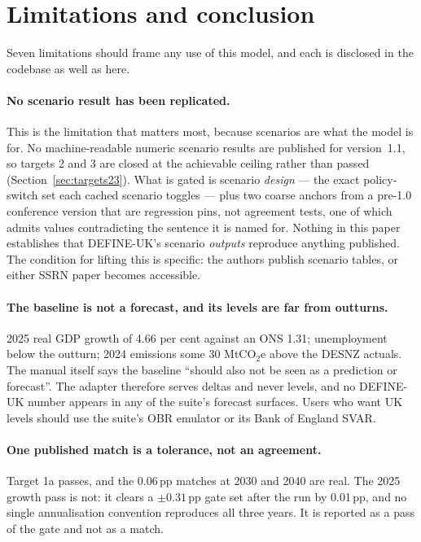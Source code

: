 \section{Limitations and conclusion}
\label{sec:limitations}

Seven limitations should frame any use of this model, and each is disclosed in the codebase as well as here.

\paragraph{No scenario result has been replicated.} This is the limitation that matters most, because scenarios are what the model is for. No machine-readable numeric scenario results are published for version~1.1, so targets 2 and 3 are closed at the achievable ceiling rather than passed (Section~\ref{sec:targets23}). What is gated is scenario \emph{design} --- the exact policy-switch set each cached scenario toggles --- plus two coarse anchors from a pre-1.0 conference version that are regression pins, not agreement tests, one of which admits values contradicting the sentence it is named for. Nothing in this paper establishes that DEFINE-UK's scenario \emph{outputs} reproduce anything published. The condition for lifting this is specific: the authors publish scenario tables, or either SSRN paper becomes accessible.

\paragraph{The baseline is not a forecast, and its levels are far from outturns.} 2025 real GDP growth of 4.66 per cent against an ONS 1.31; unemployment below the outturn; 2024 emissions some 30 MtCO$_2$e above the DESNZ actuals. The manual itself says the baseline ``should also not be seen as a prediction or forecast''. The adapter therefore serves deltas and never levels, and no DEFINE-UK number appears in any of the suite's forecast surfaces. Users who want UK levels should use the suite's OBR emulator or its Bank of England SVAR.

\paragraph{One published match is a tolerance, not an agreement.} Target 1a passes, and the 0.06\,pp matches at 2030 and 2040 are real. The 2025 growth pass is not: it clears a $\pm0.31$\,pp gate set after the run by 0.01\,pp, and no single annualisation convention reproduces all three years. It is reported as a pass of the gate and not as a match.

